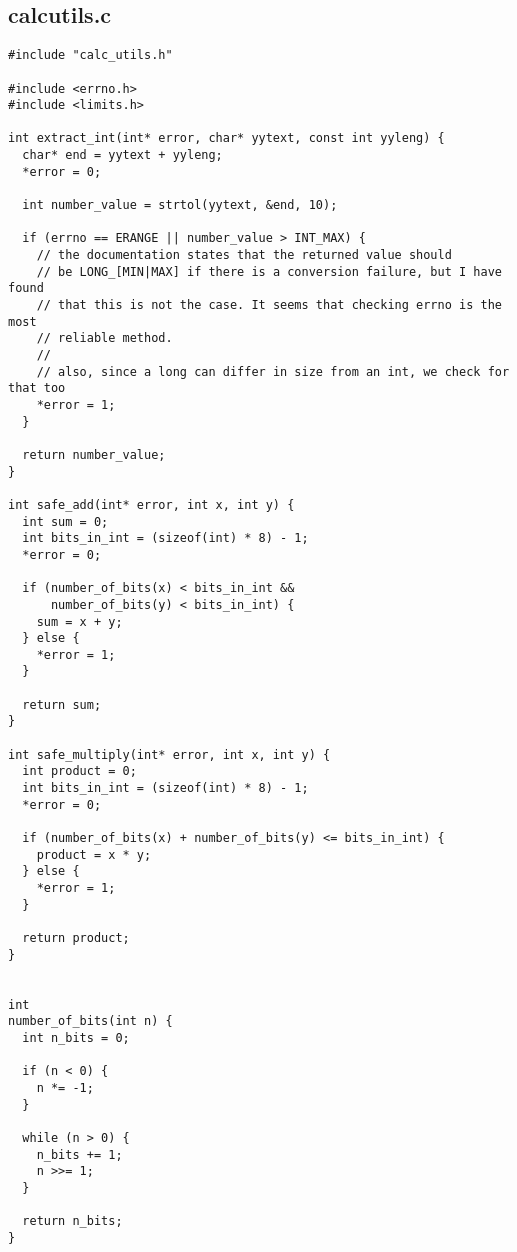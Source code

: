 \documentclass{article}
\begin{document}
\subsection{calc\textunderscore utils.c}
\begin{verbatim}
#include "calc_utils.h"

#include <errno.h>
#include <limits.h>

int extract_int(int* error, char* yytext, const int yyleng) {
  char* end = yytext + yyleng;
  *error = 0;

  int number_value = strtol(yytext, &end, 10);

  if (errno == ERANGE || number_value > INT_MAX) {
    // the documentation states that the returned value should
    // be LONG_[MIN|MAX] if there is a conversion failure, but I have found
    // that this is not the case. It seems that checking errno is the most
    // reliable method.
    //
    // also, since a long can differ in size from an int, we check for that too
    *error = 1;
  }

  return number_value;
}

int safe_add(int* error, int x, int y) {
  int sum = 0;
  int bits_in_int = (sizeof(int) * 8) - 1;
  *error = 0;

  if (number_of_bits(x) < bits_in_int &&
      number_of_bits(y) < bits_in_int) {
    sum = x + y;
  } else {
    *error = 1;
  }

  return sum;
}

int safe_multiply(int* error, int x, int y) {
  int product = 0;
  int bits_in_int = (sizeof(int) * 8) - 1;
  *error = 0;

  if (number_of_bits(x) + number_of_bits(y) <= bits_in_int) {
    product = x * y;
  } else {
    *error = 1;
  }

  return product;
}


int
number_of_bits(int n) {
  int n_bits = 0;
  
  if (n < 0) {
    n *= -1;
  }

  while (n > 0) {
    n_bits += 1;
    n >>= 1;
  }

  return n_bits;
}
\end{verbatim}
\end{document}
